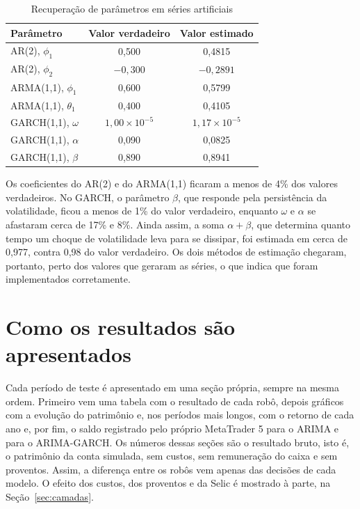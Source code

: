 \begin{table}[htbp]
\centering
\caption{Recuperação de parâmetros em séries artificiais}
\label{tab:validacao}
\fontsize{10}{12}\selectfont
\begin{tabular}{l|c|c}
\hline
Parâmetro & Valor verdadeiro & Valor estimado \\
\hline
AR(2), $\phi_1$ & 0,500 & 0,4815 \\
\hline
AR(2), $\phi_2$ & $-0{,}300$ & $-0{,}2891$ \\
\hline
ARMA(1,1), $\phi_1$ & 0,600 & 0,5799 \\
\hline
ARMA(1,1), $\theta_1$ & 0,400 & 0,4105 \\
\hline
GARCH(1,1), $\omega$ & $1{,}00\times10^{-5}$ & $1{,}17\times10^{-5}$ \\
\hline
GARCH(1,1), $\alpha$ & 0,090 & 0,0825 \\
\hline
GARCH(1,1), $\beta$ & 0,890 & 0,8941 \\
\hline
\end{tabular}
\end{table}

Os coeficientes do AR(2) e do ARMA(1,1) ficaram a menos de 4\% dos valores
verdadeiros. No GARCH, o parâmetro $\beta$, que responde pela persistência da
volatilidade, ficou a menos de 1\% do valor verdadeiro, enquanto $\omega$ e
$\alpha$ se afastaram cerca de 17\% e 8\%. Ainda assim, a soma $\alpha + \beta$,
que determina quanto tempo um choque de volatilidade leva para se dissipar, foi
estimada em cerca de 0,977, contra 0,98 do valor verdadeiro. Os dois métodos de estimação
chegaram, portanto, perto dos valores que geraram as séries, o que indica que
foram implementados corretamente.

\section{Como os resultados são apresentados}

Cada período de teste é apresentado em uma seção própria, sempre na mesma ordem.
Primeiro vem uma tabela com o resultado de cada robô, depois gráficos com a
evolução do patrimônio e, nos períodos mais longos, com o retorno de cada ano e,
por fim, o saldo registrado pelo próprio MetaTrader 5 para o ARIMA e para o
ARIMA-GARCH. Os números dessas seções são o resultado bruto,
isto é, o patrimônio da conta simulada, sem custos, sem remuneração do caixa e sem
proventos. Assim, a diferença entre os robôs vem apenas das decisões de cada
modelo. O efeito dos custos, dos proventos e da Selic é mostrado à parte, na
Seção~\ref{sec:camadas}.

